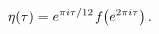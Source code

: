 \[\mathop{\eta\/}\nolimits\!\left(\tau\right)=e^{\pi i\tau/12}\mathop{\mathit{f}%
\/}\nolimits\!\left(e^{2\pi i\tau}\right).\]